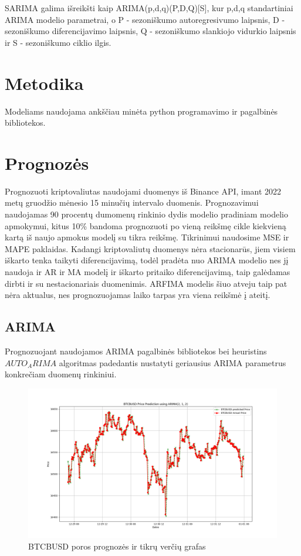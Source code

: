 \documentclass{VUMIFInfKursinis}
\begin{document}
SARIMA galima išreikšti kaip ARIMA(p,d,q)(P,D,Q)[S], kur p,d,q standartiniai ARIMA modelio parametrai, o P - sezoniškumo autoregresivumo laipsnis,
D - sezoniškumo diferencijavimo laipsnis, Q - sezoniškumo slankiojo vidurkio laipsnis ir S - sezoniškumo ciklio ilgis. 

\section{Metodika}
Modeliams naudojama ankščiau minėta python programavimo ir pagalbinės bibliotekos.

\section{Prognozės}
Prognozuoti kriptovaliutas naudojami duomenys iš Binance API\cite{binanceKlines}, imant 2022 metų gruodžio mėnesio 15 minučių intervalo duomenis.
Prognozavimui naudojamas 90 procentų dumomenų rinkinio dydis modelio pradiniam modelio apmokymui, kitus 10\% bandoma prognozuoti po vieną reikšmę cikle kiekvieną
kartą iš naujo apmokus modelį su tikra reikšmę. Tikrinimui naudosime MSE ir MAPE paklaidas.
Kadangi kriptovaliutų duomenys nėra stacionarūs, jiem visiem iškarto tenka taikyti diferencijavimą, todėl pradėta nuo ARIMA modelio nes jį naudoja ir AR
ir MA modelį ir iškarto pritaiko diferencijavimą, taip galėdamas dirbti ir su nestacionariais duomenimis. ARFIMA modelis šiuo atveju taip pat nėra aktualus,
nes prognozuojamas laiko tarpas yra viena reikšmė į ateitį.
\subsection{ARIMA}
Prognozuojant naudojamos ARIMA pagalbinės bibliotekos\cite{seabold2010statsmodels} bei heuristins $AUTO_ARIMA$ algoritmas\cite{pmdarima} padedantis nustatyti geriausius ARIMA parametrus konkrečiam duomenų rinkiniui.

\begin{figure}[H]
  \centering
  \includegraphics[scale=0.35]{img/BTCBUSD_15m_dec_final.png}
  \caption{BTCBUSD poros prognozės ir tikrų verčių grafas}
  \label{fig:btcbusd_results}
\end{figure}
\end{document}
